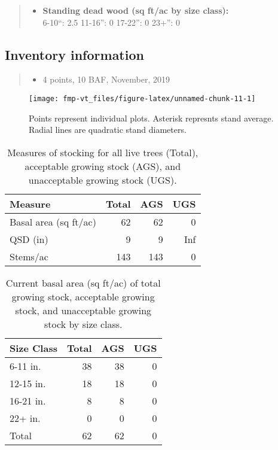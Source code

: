 \documentclass[]{tufte-handout}
\providecommand{\tightlist}{%
  \setlength{\itemsep}{0pt}\setlength{\parskip}{0pt}}
\begin{document}
\begin{quote}
\begin{itemize}
\tightlist
\item
  \textbf{Standing dead wood (sq ft/ac by size class):}\\
  \vspace{2pt} \indent \small 6-10``: 2.5 \textbar{} 11-16'': 0
  \textbar{} 17-22'': 0 \textbar{} 23+'': 0
\end{itemize}
\end{quote}

\subsection{Inventory information}\label{inventory-information-1}

\begin{quote}
\begin{itemize}
\tightlist
\item
  4 points, 10 BAF, November, 2019
\end{itemize}
\end{quote}

\begin{figure}
\texttt{[image: fmp-vt\_files/figure-latex/unnamed-chunk-11-1]} \caption[Points represent individual plots]{Points represent individual plots. Asterisk represnts stand average. Radial lines are quadratic stand diameters.}\label{fig:unnamed-chunk-11}
\end{figure}

\begin{table}

\caption{\label{tab:unnamed-chunk-12}Measures of stocking for all live trees (Total), acceptable growing stock (AGS), and unacceptable growing stock (UGS).}
\centering
\begin{tabular}[t]{lrrr}
\toprule
Measure & Total & AGS & UGS\\
\midrule
Basal area (sq ft/ac) & 62 & 62 & 0\\
QSD (in) & 9 & 9 & Inf\\
Stems/ac & 143 & 143 & 0\\
\bottomrule
\end{tabular}
\end{table}

\begin{table}

\caption{\label{tab:unnamed-chunk-13}Current basal area (sq ft/ac) of total growing stock, acceptable growing stock, and unacceptable growing stock by size class.}
\centering
\begin{tabular}[t]{lrrr}
\toprule
Size Class & Total & AGS & UGS\\
\midrule
6-11 in. & 38 & 38 & 0\\
12-15 in. & 18 & 18 & 0\\
16-21 in. & 8 & 8 & 0\\
22+ in. & 0 & 0 & 0\\
Total & 62 & 62 & 0\\
\bottomrule
\end{tabular}
\end{table}
\end{document}
